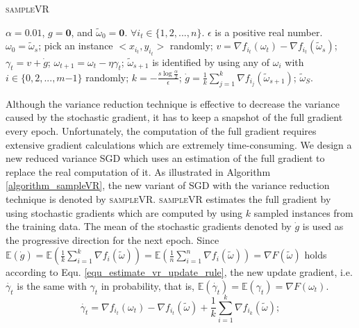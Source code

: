 \documentclass[letterpaper]{article}
\begin{document}
\begin{algorithm}[t]
    \caption{\textsc{sampleVR}}
    \label{algorithm_sampleVR}
    \begin{algorithmic}[1]
        \Require $\alpha=0.01$,  $g=\mathbf{0}$, and $\tilde{\omega}_0=\mathbf{0}$. $\forall i_t\in\{1,2, ..., n\}$.   $\epsilon$ is a positive real number.
            \State $\omega_0=\tilde{\omega}_s$;
                \State pick an instance $\mathrm{<}x_{i_t},y_{i_t}\mathrm{>}$ randomly;
                \State  $v=\nabla f_{i_t}(\omega_t)-\nabla f_{i_t}(\tilde{\omega}_s)$;
                \State $\gamma_{t}=v+\dot{g}$;
                \State $\omega_{t+1} = \omega_t - \eta \gamma_{t}$;
            \EndFor
            \State $\tilde{\omega}_{s+1}$ is identified by using any of $\omega_{i}$ with $i\mathrm{\in}\{0,2, ..., m\mathrm{-}1\}$ randomly;
            \State $k=-\frac{s\log\frac{\alpha}{2}}{\epsilon}$;
            \State $\dot{g} =\frac{1}{k}\sum\limits_{j=1}^{k}\nabla f_{i_j}(\tilde{\omega}_{s+1})$;
          \EndFor
        \Return $\tilde{\omega}_S$.
    \end{algorithmic}
\end{algorithm}

Although  the variance reduction technique is effective to decrease the variance caused by the stochastic gradient, it has to keep a snapshot of the full gradient  every epoch. Unfortunately, the computation of the full gradient requires extensive gradient calculations which  are extremely time-consuming.  We design a new reduced variance SGD which uses an estimation of the full gradient to replace the real computation of it.  As illustrated in Algorithm \ref{algorithm_sampleVR}, the new variant of SGD with the variance reduction technique is denoted by \textsc{sampleVR}.  \textsc{sampleVR} estimates the full gradient by using  stochastic gradients which are computed by using $k$ sampled  instances  from the training data.  The mean of the stochastic gradients denoted by $\dot{g}$ is used as the progressive direction for the next epoch. Since  $\mathbb{E}(\dot{g}) = \mathbb{E} \left(  \frac{1}{k}\sum\limits_{i=1}^k\nabla f_i(\tilde{\omega}) \right)=  \mathbb{E} \left (\frac{1}{n}\sum\limits_{i=1}^n\nabla f_i(\tilde{\omega}) \right)  =  \nabla F(\tilde{\omega})$ holds according to Equ. \ref{equ_estimate_vr_update_rule}, the new update gradient, i.e. $\dot{\gamma_t}$ is the same with $\gamma_t$ in probability, that is, $\mathbb{E} (  \dot{\gamma_t}) = \mathbb{E} (\gamma_t) = \nabla F(\omega_{t})$. 
\begin{equation}
\label{equ_estimate_vr_update_rule}
\dot{\gamma_t}=\nabla f_{i_t}(\omega_{t})-\nabla f_{i_t}(\tilde{\omega})+\frac{1}{k}\sum\limits_{i=1}^k\nabla f_{i_k}(\tilde{\omega});
\end{equation}
\end{document}
